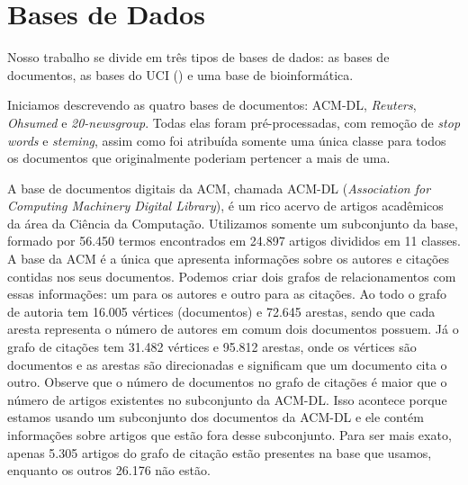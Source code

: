 

\section{Bases de Dados}
\label{subsec::base}

Nosso trabalho se divide em três tipos de bases de dados: as bases de documentos, as bases do \textsc{UCI} (\cite{UCI98}) e uma base de bioinformática.

Iniciamos descrevendo as quatro bases de documentos: \textsc{ACM-DL}, \textit{Reuters}, \textit{Ohsumed} e \textit{20-newsgroup}.
 Todas elas foram pré-processadas, com remoção de \textit{stop words} e \textit{steming}, assim como foi atribuída somente uma única classe para todos os documentos que originalmente poderiam pertencer a mais de uma.

A base de documentos digitais da \textsc{ACM}, chamada \textsc{ACM-DL} (\textit{Association for Computing Machinery Digital Library}), é um rico acervo de artigos acadêmicos da área da Ciência da Computação. Utilizamos somente um subconjunto da base, formado por 56.450 termos encontrados em 24.897 artigos divididos em 11 classes.
A base da \textsc{ACM} é a única que apresenta informações sobre os autores e citações contidas nos seus documentos.
Podemos criar dois grafos de relacionamentos com essas informações: um para os autores e outro para as citações.
Ao todo o grafo de autoria tem 16.005 vértices (documentos) e 72.645 arestas, sendo que cada aresta representa o número de autores em comum dois documentos possuem.
Já o grafo de citações tem 31.482 vértices e 95.812 arestas, onde os vértices são documentos e as arestas são direcionadas e significam que um documento cita o outro.
Observe que o número de documentos no grafo de citações é maior que o número de artigos existentes no subconjunto da \textsc{ACM-DL}. Isso acontece porque estamos usando um subconjunto dos documentos da \textsc{ACM-DL} e ele contém informações sobre artigos que estão fora desse subconjunto. Para ser mais exato, apenas 5.305 artigos do grafo de citação estão presentes na base que usamos, enquanto os outros 26.176 não estão.


